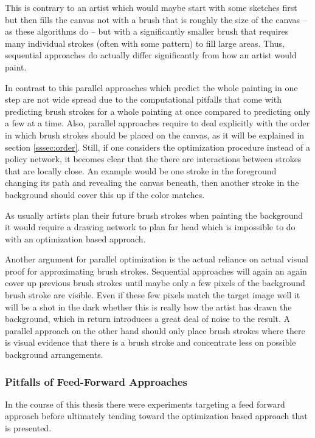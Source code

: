 This is contrary to an artist which would maybe start with some sketches first but
then fills the canvas not with a brush that is roughly the size of the canvas -- as these
algorithms do -- but with a significantly smaller brush that requires many individual
strokes (often with some pattern) to fill large areas.
Thus, sequential approaches do actually differ significantly from how an artist would
paint.

In contrast to this parallel approaches which predict the whole painting in one step
are not wide spread due to the computational pitfalls that come with predicting
brush strokes for a whole painting at once compared to predicting only a few at a time.
Also, parallel approaches require to deal explicitly with the order in which brush
strokes should be placed on the canvas, as it will be explained in section \ref{sssec:order}.
Still, if one considers the optimization procedure instead of a policy network,
it becomes clear that the there are interactions between strokes that are locally
close.
An example would be one stroke in the foreground changing its path and revealing
the canvas beneath, then another stroke in the background should cover this up if
the color matches.

As usually artists plan their future brush strokes when painting the background
it would require a drawing network to plan far head which is impossible to do with
an optimization based approach.

Another argument for parallel optimization is the actual reliance on actual visual
proof for approximating brush strokes.
Sequential approaches will again an again cover up previous brush strokes until maybe
only a few pixels of the background brush stroke are visible.
Even if these few pixels match the target image well it will be a shot in the dark
whether this is really how the artist has drawn the background, which in return
introduces a great deal of noise to the result.
A parallel approach on the other hand should only place brush strokes where there
is visual evidence that there is a brush stroke and concentrate less on possible
background arrangements.

\subsubsection{Pitfalls of Feed-Forward Approaches}

In the course of this thesis there were experiments targeting a feed forward approach
before ultimately tending toward the optimization based approach that is presented.


